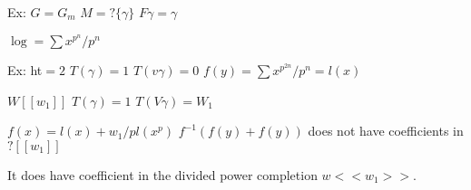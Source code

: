 Ex: $G= G_m$
$M= ?\{\gamma\}$
$F\gamma= \gamma$

$\log = \sum x^{p^n}/p^n$

Ex: ht$=2$ 
$T(\gamma)=1$
$T(v\gamma)=0$
$f(y)= \sum x^{p^{2n}}/p^n= l(x)$

$W[[w_1]]$
$T(\gamma)=1$
$T(V\gamma)=W_1$

$f(x)= l(x)+ w_1/p l(x^p)$
$f^{-1}(f(y)+f(y))$ does not have coefficients in $?[[w_1]]$

It does have coefficient in the divided power completion $w<<w_1>>$. 






































